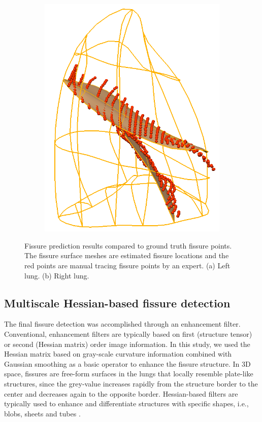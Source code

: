 {\begin{figure}[htbp]
\begin{subfigure}{.37\linewidth}
  \includegraphics[width=\linewidth,trim={{.0\wd0} {.0\wd0} {.0\wd0} {.0\wd0}},clip]{Segmentation/Image/ProjectedRightFissureMesh.png}
  \caption{}
  \label{fig:PCAFissurePrediction-b} 
\end{subfigure}
\caption{Fissure prediction results compared to ground truth fissure points. The fissure surface meshes are estimated fissure locations and the red points are manual tracing fissure points by an expert. (a) Left lung. (b) Right lung.}
\label{fig:PCAFissurePrediction}
\end{figure}
\subsection{Multiscale Hessian-based fissure detection}

The final fissure detection was accomplished through an enhancement filter. Conventional, enhancement filters are typically based on first (structure tensor) or second (Hessian matrix) order image information. In this study, we used the Hessian matrix based on gray-scale curvature information combined with Gaussian smoothing as a basic operator to enhance the fissure structure. In 3D space, fissures are free-form surfaces in the lungs that locally resemble plate-like structures, since the grey-value increases rapidly from the structure border to the center and decreases again to the opposite border. Hessian-based filters are typically used to enhance and differentiate structures with specific shapes, i.e., blobs, sheets and tubes \citep{frangi1998multiscale,lorenz1997multi}.

}
